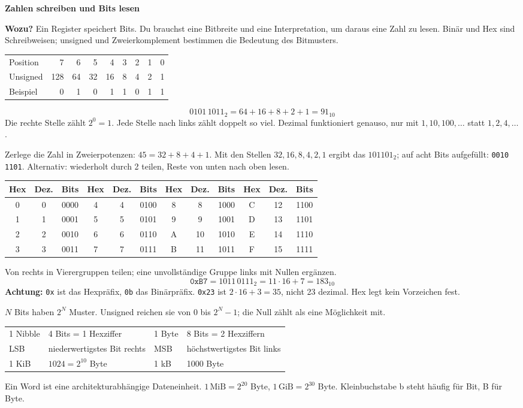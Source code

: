 \documentclass[10pt,a4paper]{article}
\newcommand{\titlepagepart}[2]{\vspace*{-4mm}{\sffamily\small #1}\par{\sffamily\LARGE\bfseries #2}\par\vspace{2mm}}
\newcommand{\block}[1]{\par\vspace{2mm}{\sffamily\large\bfseries #1}\par}
\newcommand{\code}[1]{\texttt{#1}}
\begin{document}
\titlepagepart{01 / GRUNDLAGEN}{Zahlen schreiben und Bits lesen}
\textbf{Wozu?} Ein Register speichert Bits. Du brauchst eine Bitbreite und eine
Interpretation, um daraus eine Zahl zu lesen. Binär und Hex sind Schreibweisen;
unsigned und Zweierkomplement bestimmen die Bedeutung des Bitmusters.

\block{Stellenwerte: Nur die Stellen mit einer 1 mitzählen}
\begin{center}
\begin{tabular}{lrrrrrrrr}\toprule
Position &7&6&5&4&3&2&1&0\\
Unsigned &128&64&32&16&8&4&2&1\\
Beispiel &0&1&0&1&1&0&1&1\\\bottomrule
\end{tabular}
\end{center}
\[0101\,1011_2=64+16+8+2+1=91_{10}\]
Die rechte Stelle zählt $2^0=1$. Jede Stelle nach links zählt doppelt so viel.
Dezimal funktioniert genauso, nur mit $1,10,100,\ldots$ statt $1,2,4,\ldots$.

\block{Dezimal nach Binär}
Zerlege die Zahl in Zweierpotenzen: $45=32+8+4+1$.
Mit den Stellen $32,16,8,4,2,1$ ergibt das $101101_2$; auf acht Bits aufgefüllt:
\code{0010 1101}. Alternativ: wiederholt durch 2 teilen, Reste von unten nach oben lesen.

\block{Hex: Eine Ziffer entspricht vier Bits}
\begin{center}
\begin{tabular}{ccc|ccc|ccc|ccc}\toprule
Hex&Dez.&Bits&Hex&Dez.&Bits&Hex&Dez.&Bits&Hex&Dez.&Bits\\\midrule
0&0&0000&4&4&0100&8&8&1000&C&12&1100\\
1&1&0001&5&5&0101&9&9&1001&D&13&1101\\
2&2&0010&6&6&0110&A&10&1010&E&14&1110\\
3&3&0011&7&7&0111&B&11&1011&F&15&1111\\\bottomrule
\end{tabular}
\end{center}
Von rechts in Vierergruppen teilen; eine unvollständige Gruppe links mit Nullen ergänzen.
\[\texttt{0xB7}=1011\,0111_2=11\cdot16+7=183_{10}\]
\textbf{Achtung:} \code{0x} ist das Hexpräfix, \code{0b} das Binärpräfix.
\code{0x23} ist $2\cdot16+3=35$, nicht 23 dezimal. Hex legt kein Vorzeichen fest.

\block{Breite und Einheiten}
$N$ Bits haben $2^N$ Muster. Unsigned reichen sie von $0$ bis $2^N-1$;
die Null zählt als eine Möglichkeit mit.
\begin{center}
\begin{tabular}{ll|ll}\toprule
1 Nibble &4 Bits = 1 Hexziffer&1 Byte&8 Bits = 2 Hexziffern\\
LSB&niederwertigstes Bit rechts&MSB&höchstwertigstes Bit links\\
1 KiB&$1024=2^{10}$ Byte&1 kB&1000 Byte\\\bottomrule
\end{tabular}
\end{center}
Ein Word ist eine architekturabhängige Dateneinheit. $1\,\mathrm{MiB}=2^{20}$ Byte,
$1\,\mathrm{GiB}=2^{30}$ Byte. Kleinbuchstabe b steht häufig für Bit, B für Byte.
\end{document}
